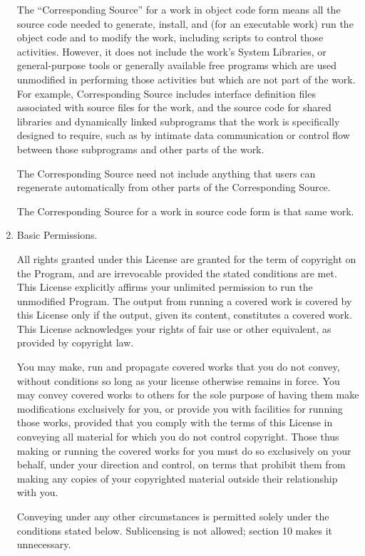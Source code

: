\documentclass[11pt,a4paper]{refrep}
\begin{document}
\begin{fullpage}
\begin{enumerate}
The ``Corresponding Source'' for a work in object code form means all
the source code needed to generate, install, and (for an executable
work) run the object code and to modify the work, including scripts to
control those activities.  However, it does not include the work's
System Libraries, or general-purpose tools or generally available free
programs which are used unmodified in performing those activities but
which are not part of the work.  For example, Corresponding Source
includes interface definition files associated with source files for
the work, and the source code for shared libraries and dynamically
linked subprograms that the work is specifically designed to require,
such as by intimate data communication or control flow between those
subprograms and other parts of the work.

The Corresponding Source need not include anything that users
can regenerate automatically from other parts of the Corresponding
Source.

The Corresponding Source for a work in source code form is that
same work.

\item Basic Permissions.

All rights granted under this License are granted for the term of
copyright on the Program, and are irrevocable provided the stated
conditions are met.  This License explicitly affirms your unlimited
permission to run the unmodified Program.  The output from running a
covered work is covered by this License only if the output, given its
content, constitutes a covered work.  This License acknowledges your
rights of fair use or other equivalent, as provided by copyright law.

You may make, run and propagate covered works that you do not
convey, without conditions so long as your license otherwise remains
in force.  You may convey covered works to others for the sole purpose
of having them make modifications exclusively for you, or provide you
with facilities for running those works, provided that you comply with
the terms of this License in conveying all material for which you do
not control copyright.  Those thus making or running the covered works
for you must do so exclusively on your behalf, under your direction
and control, on terms that prohibit them from making any copies of
your copyrighted material outside their relationship with you.

Conveying under any other circumstances is permitted solely under
the conditions stated below.  Sublicensing is not allowed; section 10
makes it unnecessary.


\end{enumerate}
\end{fullpage}
\end{document}
